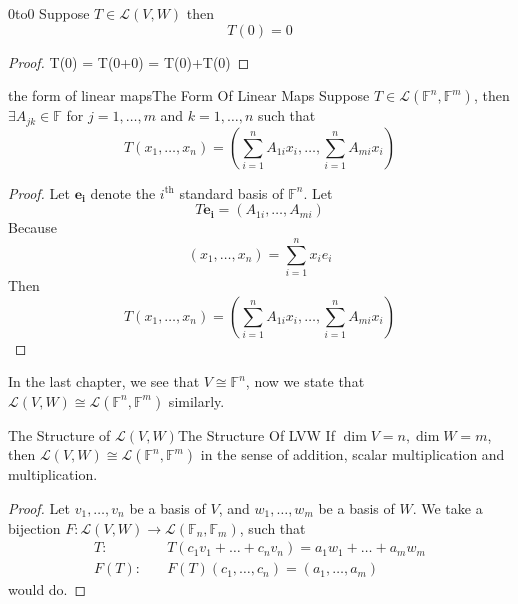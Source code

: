\documentclass[../main.tex]{subfiles}
\begin{document}
\begin{theorem}{}{0to0}
Suppose $T\in \mathscr{L}(V,W)$ then
\begin{equation*}
T(0) = 0
\end{equation*}
\end{theorem}
\begin{proof}
T(0) = T(0+0) = T(0)+T(0)
\end{proof}

\begin{theorem}{the form of linear maps}{The Form Of Linear Maps}
Suppose $T\in \mathscr{L}(\mathbb{F}^n,\mathbb{F}^m)$, then $\exists A_{jk}\in \mathbb{F}$ for $j=1, \ldots ,m$ and $k=1, \ldots ,n$ such that
\begin{equation}
T(x_1, \ldots ,x_n) = (\sum_{i=1}^{n} A_{1i}x_i, \ldots ,\sum_{i=1}^{n} A_{mi}x_i)
\end{equation}
\end{theorem}
\begin{proof}
Let $\boldsymbol{e_i}$ denote the $i^\text{th}$ standard basis of $\mathbb{F}^n$. Let
\begin{equation*}
T \boldsymbol{e_i} = (A_{1i}, \ldots ,A_{mi})
\end{equation*}
Because
\begin{equation*}
	(x_1, \ldots ,x_n) = \sum_{i=1}^{n} x_i e_i
\end{equation*}
Then
\begin{equation*}
T(x_1, \ldots ,x_n) = (\sum_{i=1}^{n} A_{1i}x_i, \ldots ,\sum_{i=1}^{n} A_{mi}x_i)
\end{equation*}
\end{proof}

In the last chapter, we see that $V \cong \mathbb{F}^n$, now we state that $\mathscr{L}(V,W) \cong \mathscr{L}(\mathbb{F}^n,\mathbb{F}^m)$ similarly.
\begin{theorem}{The Structure of $\mathscr{L}(V,W)$}{The Structure Of LVW}
If $\dim V = n,\dim W = m$, then $\mathscr{L}(V,W)\cong \mathscr{L}(\mathbb{F}^n,\mathbb{F}^m)$ in the sense of addition, scalar multiplication and multiplication.
\end{theorem}
\begin{proof}
Let $v_1, \ldots ,v_n$ be a basis of $V$, and $w_1, \ldots ,w_m$ be a basis of $W$. We take a bijection $F:\mathscr{L}(V,W) \rightarrow  \mathscr{L}(\mathbb{F}_n,\mathbb{F}_m)$, such that
\begin{equation}
\begin{aligned}
	T: & \quad T(c_1v_1+\ldots +c_nv_n) = a_1w_1+\ldots +a_mw_m \\
	F(T): & \quad F(T)(c_1, \ldots ,c_n) = (a_1, \ldots ,a_m)
\end{aligned}
\end{equation}
would do.
\end{proof}
\end{document}
